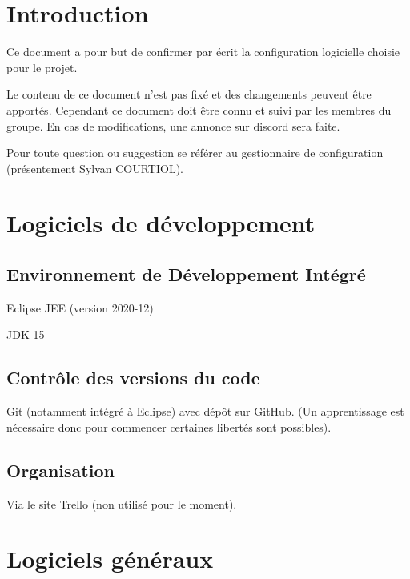 \documentclass[11pt,a4paper,titlepage,openright]{report}
\begin{document}
    \renewcommand{\contentsname}{Sommaire}
    \tableofcontents
    
    \newpage

    \setcounter{section}{0}
    \renewcommand{\thesection}{\arabic{section}} 
    \renewcommand{\thesubsection}{\arabic{section}.\arabic{subsection}}
    
    
    \section*{Introduction}
    \Large
    Ce document a pour but de confirmer par écrit la configuration logicielle choisie pour le
    projet.
    \par Le contenu de ce document n’est pas fixé et des changements peuvent être apportés. Cependant ce document doit être connu et suivi par les membres du groupe. En cas de modifications, une annonce sur discord sera faite.
    \par Pour toute question ou suggestion se référer au gestionnaire de configuration (présentement
    Sylvan COURTIOL).


    \normalsize
    \section{Logiciels de développement}
        \subsection{Environnement de Développement Intégré}
        Eclipse JEE (version 2020-12)
        \par JDK 15
        
        \subsection{Contrôle des versions du code}
        Git (notamment intégré à Eclipse) avec dépôt sur GitHub. (Un apprentissage est nécessaire
        donc pour commencer certaines libertés sont possibles).
        
        \subsection{Organisation}
        Via le site Trello (non utilisé pour le moment).
        
    \section{Logiciels généraux}
\end{document}
